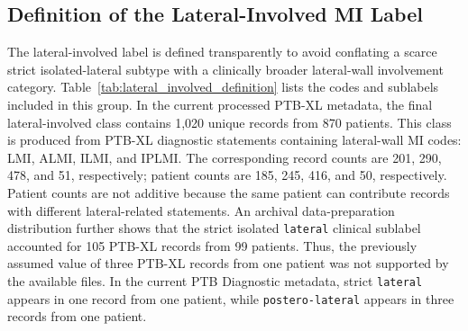 \documentclass[a4paper,fleqn]{cas-dc}
\begin{document}
\subsection{Definition of the Lateral-Involved MI Label}
The lateral-involved label is defined transparently to avoid conflating a scarce strict
isolated-lateral subtype with a clinically broader lateral-wall involvement category.
Table~\ref{tab:lateral_involved_definition} lists the codes and sublabels included in this group. In
the current processed PTB-XL metadata, the final lateral-involved class contains 1,020 unique
records from 870 patients. This class is produced from PTB-XL diagnostic statements containing
lateral-wall MI codes: LMI, ALMI, ILMI, and IPLMI. The corresponding record counts are 201, 290,
478, and 51, respectively; patient counts are 185, 245, 416, and 50, respectively. Patient counts
are not additive because the same patient can contribute records with different lateral-related
statements. An archival data-preparation distribution further shows that the strict isolated
\texttt{lateral} clinical sublabel accounted for 105 PTB-XL records from 99 patients. Thus, the
previously assumed value of three PTB-XL records from one patient was not supported by the available
files. In the current PTB Diagnostic metadata, strict \texttt{lateral} appears in one record from
one patient, while \texttt{postero-lateral} appears in three records from one patient.
\end{document}
